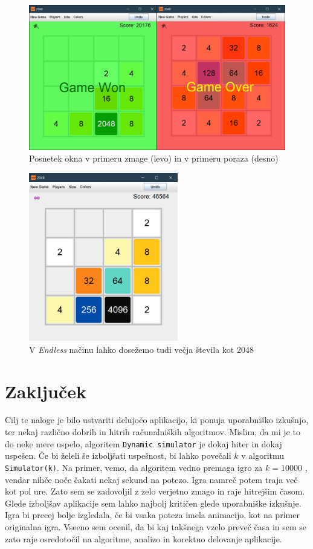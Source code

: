 \documentclass{article}
\begin{document}
\begin{figure}[ht!]
\centering
\includegraphics[width=12cm]{scr3.png}
\caption{Posnetek okna v primeru zmage (levo) in v primeru poraza (desno)}
\label{scr3}
\end{figure}

\begin{figure}[ht!]
\centering
\includegraphics[width=6.5cm]{scr4.jpg}
\caption{V \emph{Endless} načinu lahko dosežemo tudi večja števila kot 2048}
\label{scr4}
\end{figure}


\section{Zaključek}

Cilj te naloge je bilo ustvariti delujočo aplikacijo, ki ponuja uporabniško izkušnjo, ter nekaj različno dobrih in hitrih računalniških algoritmov. Mislim, da mi je to do neke mere uspelo, algoritem \texttt{Dynamic simulator} je dokaj hiter in dokaj uspešen. Če bi želeli še izboljšati uspešnost, bi lahko povečali $k$ v algoritmu \texttt{Simulator(k)}. Na primer, vemo, da algoritem vedno premaga igro za $k=10000$ \cite{stackoverflow}, vendar nihče noče čakati nekaj sekund na potezo. Igra namreč potem traja več kot pol ure. Zato sem se zadovoljil z zelo verjetno zmago in raje hitrejšim časom. Glede izboljšav aplikacije sem lahko najbolj kritičen glede uporabniške izkušnje. Igra bi precej bolje izgledala, če bi vsaka poteza imela animacijo, kot na primer originalna igra. Vseeno sem ocenil, da bi kaj takšnega vzelo preveč časa in sem se zato raje osredotočil na algoritme, analizo in korektno delovanje aplikacije.



\end{document}
